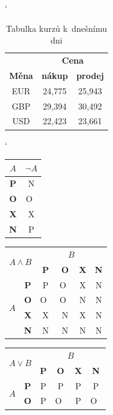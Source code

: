 \documentclass[11pt, a4paper]{article}
\begin{document}
\begin{table}[h]
\centering
\catcode`
\begin{tabular}{| c | c | c |} \hline
    & \multicolumn{2}{c|}{\textbf{Cena}} \\ \cline{2-3}
    \textbf{Měna} & \textbf{nákup} & \textbf{prodej} \\ \hline
    EUR & 24,775 & 25,943 \\
    GBP & 29,394 & 30,492 \\
    USD & 22,423 & 23,661 \\ \hline
\end{tabular}
\caption{Tabulka kurzů k~dnešnímu dni} \label{tab1}
\end{table}

\begin{table}[h]
\centering
\catcode`
\begin{tabular}{| c | c |} \hline
    $A$ & $\neg A$ \\ \hline
    \textbf{P} & N \\ \hline
    \textbf{O} & O~\\ \hline
    \textbf{X} & X \\ \hline
    \textbf{N} & P \\ \hline
\end{tabular}
\begin{tabular}{| c | c | c | c | c | c |} \hline
\multicolumn{2}{|c|}{\multirow{2}{*}{$A \wedge B$}} & \multicolumn{4}{c|}{$B$} \\ \cline{3-6}
\multicolumn{2}{|c|}{} & \textbf{P} & \textbf{O} & \textbf{X} & \textbf{N} \\ \hline
\multirow{4}{*}{$A$} & \textbf{P} & P & O~& X & N \\ \cline{2-6}
& \textbf{O} & O~& O~& N & N \\ \cline{2-6}
& \textbf{X} & X & N & X & N \\ \cline{2-6}
& \textbf{N} & N & N & N & N \\ \hline
\end{tabular}
\begin{tabular}{| c | c | c | c | c | c |} \hline
\multicolumn{2}{|c|}{\multirow{2}{*}{$A \vee B$}} & \multicolumn{4}{c|}{$B$} \\ \cline{3-6}
\multicolumn{2}{|c|}{} & \textbf{P} & \textbf{O} & \textbf{X} & \textbf{N} \\ \hline
\multirow{4}{*}{$A$} & \textbf{P} & P & P & P & P \\ \cline{2-6}
& \textbf{O} & P & O~& P & O~\\ \cline{2-6}

\end{tabular}
\end{table}
\end{document}
